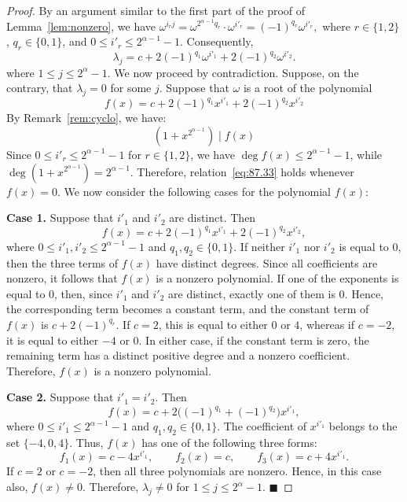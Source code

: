 \documentclass[12pt]{article}
\begin{document}
\begin{proof}
By an argument similar to the first part of the proof of Lemma~\ref{lem:nonzero}, we have
$
\omega^{i_rj}
=\omega^{2^{\alpha-1}q_r} \cdot \omega^{i'_r}
=(-1)^{q_r}\omega^{i'_r},
$
where $r\in\{1,2\}$, $q_r\in\{0,1\}$, and
$0\le i'_r\le 2^{\alpha-1}-1$.	
Consequently,
\begin{equation}\label{eq:6.1.4}
	\lambda_j
	=c+2(-1)^{q_1}\omega^{i'_1}
	+2(-1)^{q_2}\omega^{i'_2}.
\end{equation}
 where $1\le j\le 2^\alpha-1$. We now proceed by contradiction. Suppose, on the contrary, that \(\lambda_j = 0\) for some \(j\).
Suppose that \(\omega\) is a root of the polynomial
\[
f(x)=c+2(-1)^{q_1}x^{i'_1}+2(-1)^{q_2}x^{i'_2}
\]
By Remark~\ref{rem:cyclo}, we have:
\begin{equation}\label{eq:87.33}
	(1+x^{2^{\alpha-1}}) \mid f(x)
\end{equation}
Since \(0 \le i'_r \le 2^{\alpha-1}-1\) for $r \in \{1, 2\}$, we have \(\deg f(x) \le 2^{\alpha-1}-1\), while \(\deg(1+x^{2^{\alpha-1}})=2^{\alpha-1}\). Therefore, relation~\eqref{eq:87.33} holds whenever $f(x)=0$. We now consider the following cases for the polynomial $f(x)$:

\textbf{Case 1.} Suppose that $i'_1$ and $i'_2$ are distinct. Then
\[
f(x)=c+2(-1)^{q_1}x^{i'_1}+2(-1)^{q_2}x^{i'_2},
\]
where $0\le i'_1,i'_2\le 2^{\alpha-1}-1$ and $q_1,q_2\in\{0,1\}$.
If neither $i'_1$ nor $i'_2$ is equal to $0$, then the three terms of
$f(x)$ have distinct degrees. Since all coefficients are nonzero,
it follows that $f(x)$ is a nonzero polynomial. If one of the
exponents is equal to $0$, then, since $i'_1$ and $i'_2$ are distinct,
exactly one of them is $0$. Hence, the corresponding term becomes a
constant term, and the constant term of $f(x)$ is
$
c+2(-1)^{q_r}.
$
If $c=2$, this is equal to either $0$ or $4$, whereas if $c=-2$, it is
equal to either $-4$ or $0$. In either case, if the constant term is
zero, the remaining term has a distinct positive degree and a nonzero
coefficient. Therefore, $f(x)$ is a nonzero polynomial.

\textbf{Case 2.} Suppose that $i'_1=i'_2$. Then
\[
f(x)=c+2\big((-1)^{q_1}+(-1)^{q_2}\big)x^{i'_1},
\]
where $0\le i'_1\le 2^{\alpha-1}-1$ and $q_1,q_2\in\{0,1\}$.
The coefficient of $x^{i'_1}$ belongs to the set $\{-4,0,4\}$.
Thus, $f(x)$ has one of the following three forms:
\[
f_1(x)=c-4x^{i'_1},\qquad
f_2(x)=c,\qquad
f_3(x)=c+4x^{i'_1}.
\]
If $c=2$ or $c=-2$, then all three polynomials are nonzero.
Hence, in this case also, $f(x)\ne0$. Therefore,
$
\lambda_j\ne 0$ for $1\le j\le2^\alpha-1.
$
\hfill$\blacksquare$
\end{proof}
\end{document}

